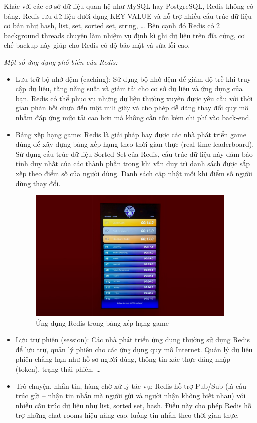 Khác với các cơ sở dữ liệu quan hệ như MySQL hay PostgreSQL,
Redis không có bảng. Redis lưu dữ liệu dưới dạng KEY-VALUE và hỗ
trợ nhiều cấu trúc dữ liệu cơ bản như hash, list, set,
sorted set, string, … Bên cạnh đó Redis có 2 background threads chuyên
làm nhiệm vụ định kì ghi dữ liệu trên đĩa cứng, cơ chế backup
này giúp cho Redis có độ bảo mật và sửa lỗi cao.

\textit{Một số ứng dụng phổ biến của Redis:}
\begin{itemize}[topsep=0ex]
\item Lưu trữ bộ nhớ đệm (caching): Sử dụng bộ nhớ đệm để giảm độ trễ
    khi truy cập dữ liệu, tăng năng suất và giảm tải cho cơ sở dữ
    liệu và ứng dụng của bạn. Redis có thể phục vụ những dữ liệu thường
    xuyên được yêu cầu với thời gian phản hồi chưa đến một mili giây
    và cho phép dễ dàng thay đổi quy mô nhằm đáp ứng mức tải cao hơn
    mà không cần tốn kém chi phí vào back-end.

\item Bảng xếp hạng game: Redis là giải pháp hay được các nhà phát
    triển game dùng để xây dựng bảng xếp hạng theo thời gian thực
    (real-time leaderboard). Sử dụng cấu trúc dữ liệu Sorted Set của
    Redis, cấu trúc dữ liệu này đảm bảo tính duy nhất của các thành
    phần trong khi vẫn duy trì danh sách được sắp xếp theo điểm số
    của người dùng. Danh sách cập nhật mỗi khi điểm số người dùng thay đổi.

\begin{figure}[H]
    \centering
    \includegraphics[width=10cm]{images/real-time-leaderboard.jpg}
    \caption{Ứng dụng Redis trong bảng xếp hạng game}
\end{figure}

\item Lưu trữ phiên (session): Các nhà phát triển ứng dụng thường sử
    dụng Redis để lưu trữ, quản lý phiên cho các ứng dụng quy mô
    Internet. Quản lý dữ liệu phiên chẳng hạn như hồ sơ người dùng,
    thông tin xác thực đăng nhập (token), trạng thái phiên, …

\item Trò chuyện, nhắn tin, hàng chờ xử lý tác vụ: Redis hỗ trợ Pub/Sub
    (là cấu trúc gửi – nhận tin nhắn mà người gửi và người nhận không
    biết nhau) với nhiều cấu trúc dữ liệu như list, sorted set, hash.
    Điều này cho phép Redis hỗ trợ những chat rooms hiệu năng cao,
    luồng tin nhắn theo thời gian thực.
\end{itemize}

